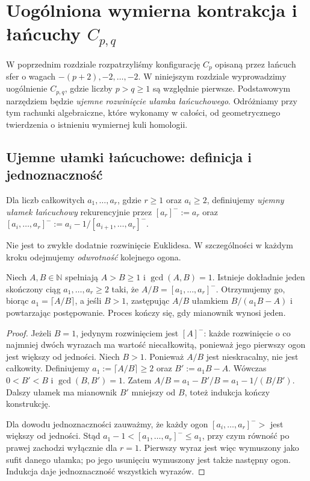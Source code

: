\chapter{Uogólniona wymierna kontrakcja i łańcuchy \texorpdfstring{$C_{p,q}$}{Cpq}}
\label{ch:tg-rb-general}

W poprzednim rozdziale rozpatrzyliśmy konfigurację $C_p$ opisaną przez
łańcuch sfer o wagach $-(p+2),-2,\ldots,-2$. W niniejszym
rozdziale wyprowadzimy uogólnienie $C_{p,q}$, gdzie liczby $p>q\geq1$
są względnie pierwsze. Podstawowym narzędziem będzie \emph{ujemne
rozwinięcie ułamka łańcuchowego}. Odróżniamy przy tym rachunki
algebraiczne, które wykonamy w całości, od geometrycznego twierdzenia
o istnieniu wymiernej kuli homologii.

\section{Ujemne ułamki łańcuchowe: definicja i jednoznaczność}
\label{sec:tg-general-cf}

\begin{definicja}
Dla liczb całkowitych $a_1,\ldots,a_r$, gdzie $r\geq1$ oraz
$a_i\geq2$, definiujemy \emph{ujemny ułamek łańcuchowy}
rekurencyjnie przez $[a_r]^-:=a_r$ oraz
$[a_i,\ldots,a_r]^-:=a_i-1/[a_{i+1},\ldots,a_r]^-$.
\end{definicja}

Nie jest to zwykłe dodatnie rozwinięcie Euklidesa. W szczególności
w każdym kroku odejmujemy \emph{odwrotność} kolejnego ogona.

\begin{twierdzenie}
\label{thm:tg-cf-algorithm}
Niech $A,B\in\mathbb N$ spełniają $A>B\geq1$ i
$\gcd(A,B)=1$. Istnieje dokładnie jeden skończony ciąg
$a_1,\ldots,a_r\geq2$ taki, że $A/B=[a_1,\ldots,a_r]^-$. 
Otrzymujemy go, biorąc $a_1=\lceil A/B\rceil$, a jeśli
$B>1$, zastępując $A/B$ ułamkiem $B/(a_1B-A)$ i powtarzając
postępowanie. Proces kończy się, gdy mianownik wynosi jeden.
\end{twierdzenie}

\begin{proof}
Jeżeli $B=1$, jedynym rozwinięciem jest $[A]^-$: każde
rozwinięcie o co najmniej dwóch wyrazach ma wartość niecałkowitą,
ponieważ jego pierwszy ogon jest większy od jedności. Niech
$B>1$. Ponieważ $A/B$ jest nieskracalny, nie jest całkowity.
Definiujemy $a_1:=\lceil A/B\rceil\geq2$ oraz
$B':=a_1B-A$. Wówczas $0<B'<B$ i $\gcd(B,B')=1$.
Zatem
$A/B=a_1-B'/B=a_1-1/(B/B')$.
Dalszy ułamek ma mianownik $B'$ mniejszy od $B$, toteż
indukcja kończy konstrukcję.

Dla dowodu jednoznaczności zauważmy, że każdy ogon
$[a_i,\ldots,a_r]^->$ jest większy od jedności. Stąd
$a_1-1<[a_1,\ldots,a_r]^-\leq a_1$, przy czym równość
po prawej zachodzi wyłącznie dla $r=1$.
Pierwszy wyraz jest więc wymuszony jako sufit danego ułamka;
po jego usunięciu wymuszony jest także następny ogon.
Indukcja daje jednoznaczność wszystkich wyrazów.
\end{proof}

